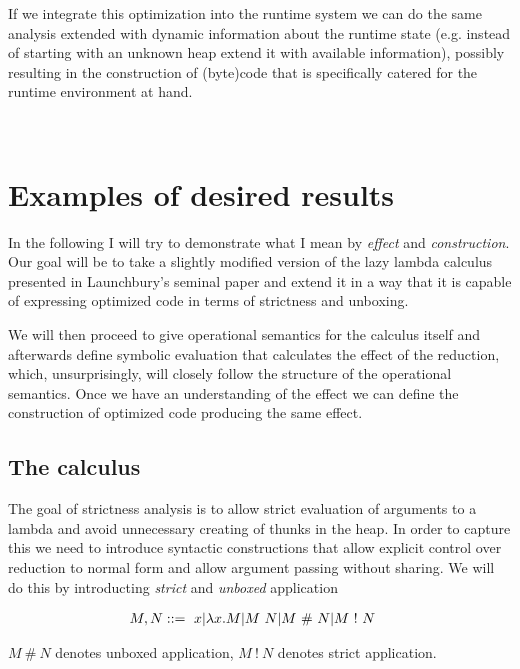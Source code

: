 \documentclass[a4paper]{article}
\begin{document}
If we integrate this optimization into the runtime system we can do the same analysis extended with dynamic information about the runtime state (e.g. instead of starting with an unknown heap extend it with available information), possibly resulting in the construction of (byte)code that is specifically catered for the runtime environment at hand.

\mbox{}\\


\section{Examples of desired results}

In the following I will try to demonstrate what I mean by \emph{effect} and \emph{construction}. Our goal will be to take a slightly modified version of the lazy lambda calculus presented in Launchbury's seminal paper\cite{Launchbury:1993:NSL:158511.158618} and extend it in a way that it is capable of expressing optimized code in terms of strictness and unboxing.

We will then proceed to give operational semantics for the calculus itself and afterwards define symbolic evaluation that calculates the effect of the reduction, which, unsurprisingly, will closely follow the structure of the operational semantics. Once we have an understanding of the effect we can define the construction of optimized code producing the same effect.

\subsection{The calculus}

The goal of strictness analysis is to allow strict evaluation of arguments to a lambda and avoid unnecessary creating of thunks in the heap. In order to capture this we need to introduce syntactic constructions that allow explicit control over reduction to normal form and allow argument passing without sharing. We will do this by introducting \emph{strict} and \emph{unboxed} application

\newcommand{\strict}{\ !\ }
\newcommand{\unboxed}{\ \#\ }

\begin{align}
  M,N&::=\ x|\lambda x.M|M \app N|M \unboxed N|M \strict N
\end{align}

$M \unboxed N$ denotes unboxed application, $M \strict N$ denotes strict application.
\end{document}
